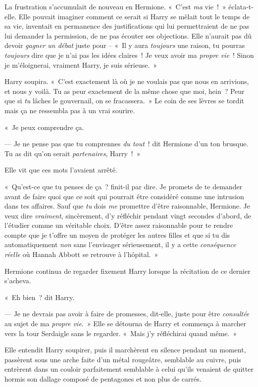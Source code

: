 La frustration s'accumulait de nouveau en Hermione. «~C'est \emph{ma} vie~!~» éclata-t-elle. Elle pouvait imaginer comment ce serait si Harry se mêlait tout le temps de sa vie, inventait en permanence des justifications qui lui permettraient de ne pas lui demander la permission, de ne pas écouter ses objections. Elle n'aurait pas dû devoir \emph{gagner un débat} juste pour -- «~Il y aura \emph{toujours} une raison, tu pourras \emph{toujours} dire que je n'ai pas les idées claires~! Je veux avoir ma \emph{propre vie}~! Sinon je m'éloignerai, vraiment Harry, je suis sérieuse.~»

Harry soupira. «~C'est exactement là où je ne voulais pas que nous en arrivions, et nous y voilà. Tu as peur exactement de la même chose que moi, hein~? Peur que si \emph{tu} lâches le gouvernail, on se fracassera.~» Le coin de ses lèvres se tordit mais ça ne ressembla pas à un vrai sourire.

«~Je peux comprendre ça.

--- Je ne pense pas que tu comprennes \emph{du tout}~! dit Hermione d'un ton brusque. Tu as dit qu'on serait \emph{partenaires}, Harry~!~»

Elle vit que ces mots l'avaient arrêté.

«~Qu'est-ce que tu penses de ça~? finit-il par dire. Je promets de te demander avant de faire quoi que ce soit qui pourrait être considéré comme une intrusion dans tes affaires. Sauf que \emph{tu} dois \emph{me} promettre d'être raisonnable, Hermione. Je veux dire \emph{vraiment}, sincèrement, d'y réfléchir pendant vingt secondes d'abord, de l'étudier comme un véritable choix. D'être assez raisonnable pour te rendre compte que je t'offre un moyen de protéger les autres filles et que si tu dis automatiquement \emph{non} sans l'envisager sérieusement, il y a cette \emph{conséquence réelle} où Hannah Abbott se retrouve à l'hôpital.~»

Hermione continua de regarder fixement Harry lorsque la récitation de ce dernier s'acheva.

«~Eh bien~? dit Harry.

--- Je ne devrais pas avoir à faire de promesses, dit-elle, juste pour être \emph{consultée} au sujet de ma \emph{propre vie}.~» Elle se détourna de Harry et commença à marcher vers la tour Serdaigle sans le regarder. «~Mais j'y réfléchirai quand même.~»

Elle entendit Harry soupirer, puis il marchèrent en silence pendant un moment, passèrent sous une arche faite d'un métal rougeâtre, semblable au cuivre, puis entrèrent dans un couloir parfaitement semblable à celui qu'ils venaient de quitter hormis son dallage composé de pentagones et non plus de carrés.

